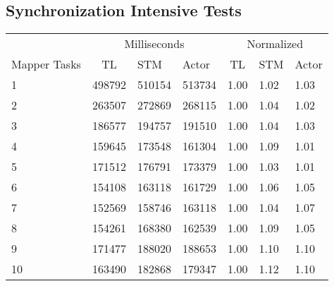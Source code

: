 {\subsection{Synchronization Intensive Tests}
\begin{center}
\begin{table}[h]
\centering
\begin{tabular}{l|cll|cll}
             & \multicolumn{3}{c|}{Milliseconds} & \multicolumn{3}{c}{Normalized} \\
Mapper Tasks & TL     & STM     & Actor     & TL      & STM      & Actor     \\ \hline
1                   &     498792      &      510154      &    513734  &	 1.00   & 1.02 &    1.03    \\
2                   &     263507      &      272869      &    268115  &  1.00   & 1.04 &    1.02    \\
3                   &     186577      &      194757      &    191510  &  1.00   & 1.04 &    1.03    \\
4                   &     159645      &      173548      &    161304  &  1.00   & 1.09 &    1.01    \\
5                   &     171512      &      176791      &    173379  &  1.00   & 1.03 &    1.01    \\
6                   &     154108      &      163118      &    161729  &  1.00   & 1.06 &    1.05    \\
7                   &     152569      &      158746      &    163118  &  1.00   & 1.04 &    1.07    \\
8                   &     154261      &      168380      &    162539  &  1.00   & 1.09 &    1.05    \\
9                   &     171477      &      188020      &    188653  &  1.00   & 1.10 &    1.10    \\
10                 &     163490      &      182868      &    179347  &	 1.00   & 1.12 &    1.10    \\
\end{tabular}
\label{table:test_results_concurrent_tasks}
\end{table}
\end{center}

}

